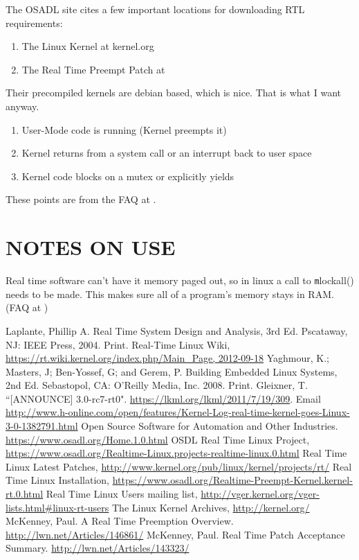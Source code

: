 \documentclass{article}
\begin{document}
The OSADL site cites a few important locations for downloading RTL requirements:
\begin{enumerate}
\item The Linux Kernel at kernel.org
\item The Real Time Preempt Patch at \cite{RealTimeLinuxPatch}
\end{enumerate}
Their precompiled kernels are debian based, which is nice.  That is what I want anyway.
\begin{enumerate}
\item User-Mode code is running (Kernel preempts it)
\item Kernel returns from a system call or an interrupt back to user space
\item Kernel code blocks on a mutex or explicitly yields
\end{enumerate}
These points are from the FAQ at \cite{RealTimeLinux}.

\section{NOTES ON USE}
Real time software can't have it memory paged out, so in linux a call to {\texttt mlockall()} needs to be made.  This makes sure all of a program's memory stays in RAM. (FAQ at \cite{RealTimeLinux})

\begin{thebibliography}{9}

Laplante, Phillip A. Real Time System Design and Analysis, 3rd Ed. Pscataway, NJ: IEEE Press, 2004. Print.
Real-Time Linux Wiki, \url{https://rt.wiki.kernel.org/index.php/Main\_Page, 2012-09-18}
Yaghmour, K.; Masters, J; Ben-Yossef, G; and Gerem, P. Building Embedded Linux Systems, 2nd Ed. Sebastopol, CA: O'Reilly Media, Inc. 2008. Print.
Gleixner, T. ``[ANNOUNCE] 3.0-rc7-rt0". \url{https://lkml.org/lkml/2011/7/19/309}. Email
\url{http://www.h-online.com/open/features/Kernel-Log-real-time-kernel-goes-Linux-3-0-1382791.html}
Open Source Software for Automation and Other Industries. \url{https://www.osadl.org/Home.1.0.html}
OSDL Real Time Linux Project, \url{https://www.osadl.org/Realtime-Linux.projects-realtime-linux.0.html}
Real Time Linux Latest Patches, \url{http://www.kernel.org/pub/linux/kernel/projects/rt/}
Real Time Linux Installation, \url{https://www.osadl.org/Realtime-Preempt-Kernel.kernel-rt.0.html}
Real Time Linux Users mailing list, \url{http://vger.kernel.org/vger-lists.html#linux-rt-users}
The Linux Kernel Archives, \url{http://kernel.org/}
McKenney, Paul. A Real Time Preemption Overview. \url{http://lwn.net/Articles/146861/}
McKenney, Paul. Real Time Patch Acceptance Summary. \url{http://lwn.net/Articles/143323/}
\end{thebibliography}
\end{document}

